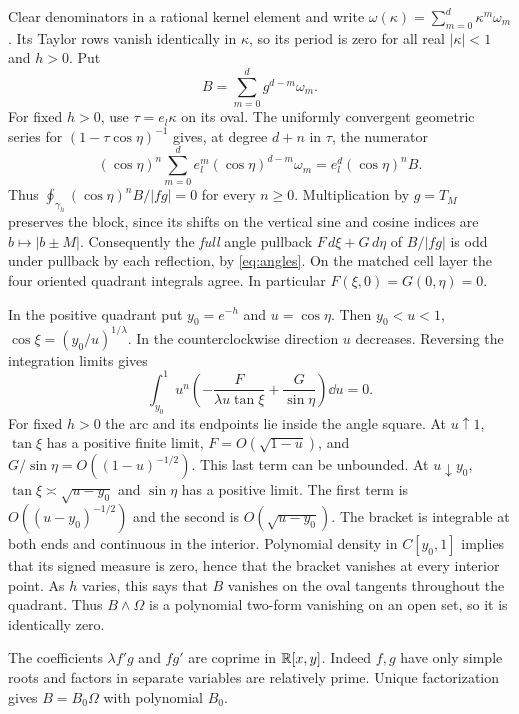 Clear denominators in a rational kernel element and write $\omega(\kappa)=\sum_{m=0}^d\kappa^m\omega_m$. Its Taylor rows vanish identically in $\kappa$, so its period is zero for all real $|\kappa|<1$ and $h>0$. Put
\[
 B=\sum_{m=0}^d g^{d-m}\omega_m .
\]
For fixed $h>0$, use $\tau=e_l\kappa$ on its oval. The uniformly convergent geometric series for $(1-\tau\cos\eta)^{-1}$ gives, at degree $d+n$ in $\tau$, the numerator
\[
 (\cos\eta)^n\sum_{m=0}^d e_l^m(\cos\eta)^{d-m}\omega_m
       = e_l^d(\cos\eta)^n B .
\]
Thus $\oint_{\gamma_h}(\cos\eta)^n B/|fg|=0$ for every $n\ge0$. Multiplication by $g=T_M$ preserves the block, since its shifts on the vertical sine and cosine indices are $b\mapsto |b\pm M|$. Consequently the \emph{full} angle pullback $F\,d\xi+G\,d\eta$ of $B/|fg|$ is odd under pullback by each reflection, by \eqref{eq:angles}. On the matched cell layer the four oriented quadrant integrals agree. In particular $F(\xi,0)=G(0,\eta)=0$.

In the positive quadrant put $y_0=e^{-h}$ and $u=\cos\eta$. Then $y_0<u<1$, $\cos\xi=(y_0/u)^{1/\lambda}$. In the counterclockwise direction $u$ decreases. Reversing the integration limits gives
\begin{equation}\label{eq:moment}
 \int_{y_0}^1 u^n\left(-\frac{F}{\lambda u\tan\xi}
                      +\frac{G}{\sin\eta}\right)\dd u=0 .
\end{equation}
For fixed $h>0$ the arc and its endpoints lie inside the angle square. At $u\uparrow1$, $\tan\xi$ has a positive finite limit, $F=O(\sqrt{1-u})$, and $G/\sin\eta=O((1-u)^{-1/2})$. This last term can be unbounded. At $u\downarrow y_0$, $\tan\xi\asymp\sqrt{u-y_0}$ and $\sin\eta$ has a positive limit. The first term is $O((u-y_0)^{-1/2})$ and the second is $O(\sqrt{u-y_0})$. The bracket is integrable at both ends and continuous in the interior. Polynomial density in $C[y_0,1]$ implies that its signed measure is zero, hence that the bracket vanishes at every interior point. As $h$ varies, this says that $B$ vanishes on the oval tangents throughout the quadrant. Thus $B\wedge\Omega$ is a polynomial two-form vanishing on an open set, so it is identically zero.

The coefficients $\lambda f'g$ and $fg'$ are coprime in $\mathbb R[x,y]$. Indeed $f,g$ have only simple roots and factors in separate variables are relatively prime. Unique factorization gives $B=B_0\Omega$ with polynomial $B_0$.

